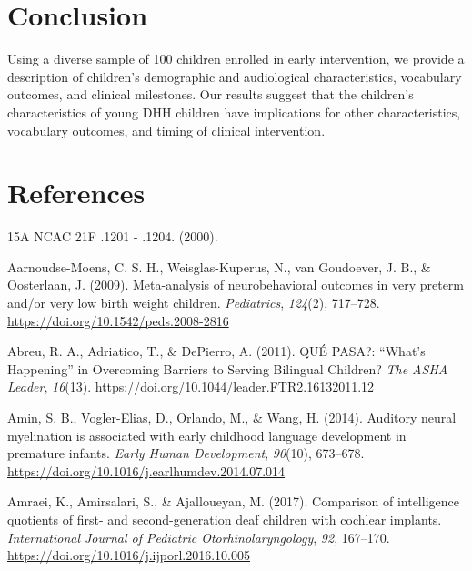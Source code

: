 \documentclass[english,man]{apa6}
\begin{document}
\hypertarget{conclusion}{%
\section{Conclusion}\label{conclusion}}

Using a diverse sample of 100 children enrolled in early intervention, we provide a description of children's demographic and audiological characteristics, vocabulary outcomes, and clinical milestones. Our results suggest that the children's characteristics of young DHH children have implications for other characteristics, vocabulary outcomes, and timing of clinical intervention.

\pagebreak

\hypertarget{references}{%
\section*{References}\label{references}}

\hypertarget{refs}{}
\leavevmode\hypertarget{ref-2000}{}%
15A NCAC 21F .1201 - .1204. (2000).

\leavevmode\hypertarget{ref-aarnoudse-moens2009}{}%
Aarnoudse-Moens, C. S. H., Weisglas-Kuperus, N., van Goudoever, J. B., \& Oosterlaan, J. (2009). Meta-analysis of neurobehavioral outcomes in very preterm and/or very low birth weight children. \emph{Pediatrics}, \emph{124}(2), 717--728. \url{https://doi.org/10.1542/peds.2008-2816}

\leavevmode\hypertarget{ref-abreu2011}{}%
Abreu, R. A., Adriatico, T., \& DePierro, A. (2011). QUÉ PASA?: ``What's Happening'' in Overcoming Barriers to Serving Bilingual Children? \emph{The ASHA Leader}, \emph{16}(13). \url{https://doi.org/10.1044/leader.FTR2.16132011.12}

\leavevmode\hypertarget{ref-amin2014}{}%
Amin, S. B., Vogler-Elias, D., Orlando, M., \& Wang, H. (2014). Auditory neural myelination is associated with early childhood language development in premature infants. \emph{Early Human Development}, \emph{90}(10), 673--678. \url{https://doi.org/10.1016/j.earlhumdev.2014.07.014}

\leavevmode\hypertarget{ref-amraei2017}{}%
Amraei, K., Amirsalari, S., \& Ajalloueyan, M. (2017). Comparison of intelligence quotients of first- and second-generation deaf children with cochlear implants. \emph{International Journal of Pediatric Otorhinolaryngology}, \emph{92}, 167--170. \url{https://doi.org/10.1016/j.ijporl.2016.10.005}
\end{document}
